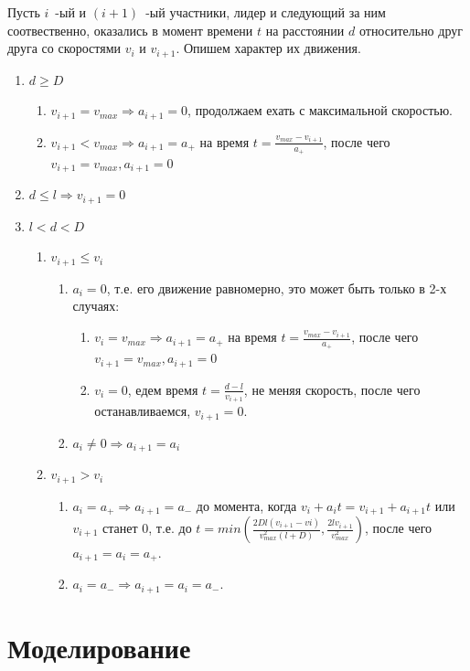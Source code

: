\documentclass[12pt, a4paper]{article}
\begin{document}
Пусть $i$~-ый и $(i+1)$~-ый участники, лидер и следующий за ним соотвественно, оказались в момент времени $t$ на расстоянии $d$ относительно друг друга со скоростями $v_i$ и $v_{i+1}$. Опишем характер их движения.
\begin{enumerate}
	\item $d \ge D $
	\begin{enumerate}
		\item $v_{i+1} = v_{max} \Rightarrow a_{i+1} = 0$, продолжаем ехать с максимальной скоростью.
		\item $v_{i+1} < v_{max} \Rightarrow a_{i+1} = a_+$ на время $t = \frac{v_{max}-v_{i+1}}{a_+}$, после чего $v_{i+1} = v_{max}, a_{i+1} = 0$
	\end{enumerate}	
	\item $d \leq l \Rightarrow v_{i+1} = 0$
	\item $l < d < D $
	\begin{enumerate}
	\item $v_{i+1} \leq v_i$
		\begin{enumerate}
			\item $a_i = 0$, т.е. его движение равномерно, это может быть только в 2-х случаях:
			\begin{enumerate}
				\item $v_i = v_{max} \Rightarrow a_{i+1} = a_+$ на время $t = \frac{v_{max}-v_{i+1}}{a_+}$, после чего $v_{i+1} = v_{max}, a_{i+1} = 0$
				\item $v_i = 0$, едем время $t = \frac{d-l}{v_{i+1}}$, не меняя скорость, после чего останавливаемся, $v_{i+1} = 0$.
			\end{enumerate}	
			\item $a_i \neq 0 \Rightarrow a_{i+1} = a_i$ 
		\end{enumerate}
	\item $v_{i+1} > v_i$ 
	\begin{enumerate}
		\item $a_i = a_+ \Rightarrow a_{i+1} = a_-$ до момента, когда $v_i + a_it = v_{i+1} + a_{i+1}t$ или $v_{i+1}$ станет $0$, т.е. до $t = min\left(\frac{2Dl(v_{i+1}-vi)}{v^2_{max}(l+D)}, \frac{2lv_{i+1}}{v^2_{max}}\right)$,  после чего $a_{i+1} = a_i = a_+$. 
		\item $a_i = a_- \Rightarrow a_{i+1} = a_i = a_-$.
	\end{enumerate}	
	\end{enumerate}
\end{enumerate}

\newpage
\section{Моделирование}
\end{document}
